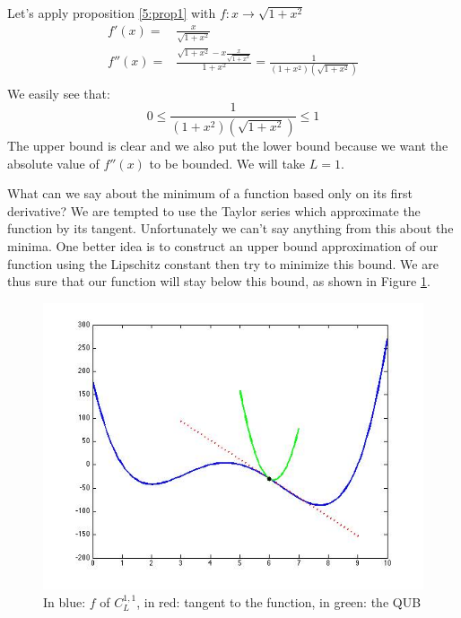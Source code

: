 \begin{example}\begin{leftbar}
Let's apply proposition \ref{5:prop1} with $f: x \rightarrow \sqrt{1+x^2}$
\begin{eqnarray*}
f'(x)=& \frac{x}{\sqrt{1+x^2}}\\
f''(x)=& \frac{ \sqrt{1+x^2}-x \frac{x}{ \sqrt{1+x^2}}}{1+x^2}=\frac{1}{(1+x^2)(\sqrt{1+x^2})}\\
\end{eqnarray*}  
We easily see that:
$$ 0 \leq \frac{1}{(1+x^2)(\sqrt{1+x^2})} \leq 1$$
The upper bound is clear and we also put the lower bound because we want the absolute value of $f''(x)$ to be bounded. We  will take $L=1$.
\end{leftbar}\end{example}

What can we say about the minimum of a function based only on its first derivative? We are tempted to use the Taylor series which approximate the function by its tangent.  Unfortunately  we can't say anything from this about the minima. One better idea is to construct an upper bound approximation of our function using the Lipschitz constant then try to minimize this bound. We are thus sure that our function will stay below this bound, as shown in Figure \ref{5:fig1}. 

\begin{figure}[H]
\begin{center}
\includegraphics[scale=0.6]{./images/Course5_construction} 
\caption{In blue: $f$ of $C_L^{1,1}$, in red: tangent to the function, in green: the QUB}
\label{5:fig1}
\end{center}
\end{figure}

